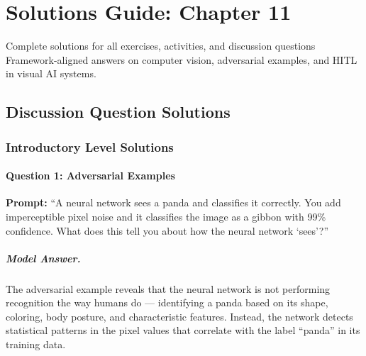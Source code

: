 
\chapter{Solutions Guide: Chapter 11}
\label{ch:solutions-ch11}

\begin{chapterquote}{Complete solutions for all exercises, activities, and discussion questions}
Framework-aligned answers on computer vision, adversarial examples, and HITL in visual AI systems.
\end{chapterquote}

\section{Discussion Question Solutions}

\subsection{Introductory Level Solutions}

\subsubsection{Question 1: Adversarial Examples}

\textbf{Prompt:} ``A neural network sees a panda and classifies it correctly. You add imperceptible pixel noise and it classifies the image as a gibbon with 99\% confidence. What does this tell you about how the neural network `sees'?''

\paragraph{Model Answer.}

The adversarial example reveals that the neural network is not performing recognition the way humans do --- identifying a panda based on its shape, coloring, body posture, and characteristic features. Instead, the network detects statistical patterns in the pixel values that correlate with the label ``panda'' in its training data.

